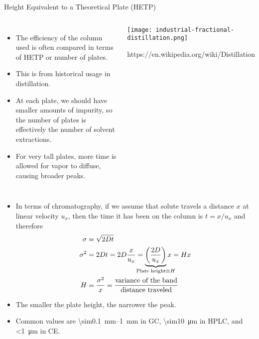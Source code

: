 \documentclass[notes=only]{beamer}
\begin{document}
\begin{frame}[allowframebreaks=1]{Height Equivalent to a Theoretical Plate (HETP)}
	\begin{columns}
		\begin{itemize}
			\item The efficiency of the column used is often
				compared in terms of \alert{HETP} or \alert{number of
				plates}.
			\item This is from historical usage in distillation.
			\item At each plate, we should have smaller amounts of
				impurity, so the number of plates is effectively
				the number of solvent extractions.
			\item For very tall plates, more time is allowed for
				vapor to diffuse, causing broader peaks.
		\end{itemize}
		\begin{center}
		\texttt{[image: industrial-fractional-distillation.png]}

		{\tiny https://en.wikipedia.org/wiki/Distillation}
		\end{center}
	\end{columns}

	\framebreak

	\begin{itemize}
		\item In terms of chromatography, if we assume that solute
			travels a distance $x$ at linear velocity $u_x$, then
			the time it has been on the column is $t = x/u_x$ and
			therefore
			\begin{align*}
				\sigma &= \sqrt{2Dt} \\
				\sigma^2 &= 2Dt = 2D\frac{x}{u_x} =
				\underbrace{\bigg( \frac{2D}{u_x}
				\bigg)}_{\mathclap{\text{Plate height} \equiv
				H}} x = Hx \\
				H &= \frac{\sigma^2}{x} = \frac{\text{variance
				of the band}}{\text{distance traveled}}
			\end{align*}
		\item The \alert{smaller} the plate height, the \alert{narrower}
			the peak.
		\item Common values are \SIrange{\sim0.1}{1}{\mm} in GC,
			\SI{\sim10}{\um} in HPLC, and \SI{<1}{\um} in CE.
	\end{itemize}

	\framebreak


\end{frame}
\end{document}
